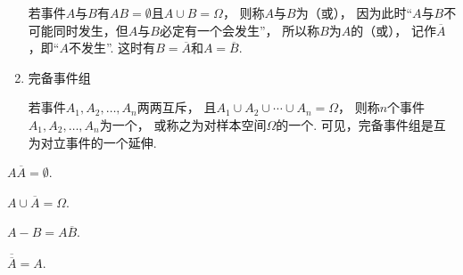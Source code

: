 \begin{definition}
\begin{enumerate}
若事件\(A\)与\(B\)有\(AB = \emptyset\)且\(A \cup B = \Omega\)，
则称\(A\)与\(B\)为（或），
因为此时“\(A\)与\(B\)不可能同时发生，但\(A\)与\(B\)必定有一个会发生”，
所以称\(B\)为\(A\)的（或），
记作\(\overline{A}\)，即“\(A\)不发生”.
这时有\(B = \overline{A}\)和\(A = \overline{B}\).

\item 完备事件组

若事件\(A_1,A_2,\dotsc,A_n\)两两互斥，
且\(A_1 \cup A_2 \cup \dotsb \cup A_n = \Omega\)，
则称\(n\)个事件\(A_1,A_2,\dotsc,A_n\)为一个，
或称之为对样本空间\(\Omega\)的一个.
可见，完备事件组是互为对立事件的一个延伸.
\end{enumerate}
\end{definition}

\begin{property}
\(A \overline{A} = \emptyset\).
\end{property}

\begin{property}
\(A \cup \overline{A} = \Omega\).
\end{property}

\begin{property}
\(A - B = A \overline{B}\).
\end{property}

\begin{property}
\(\overline{\overline{A}} = A\).
\end{property}

